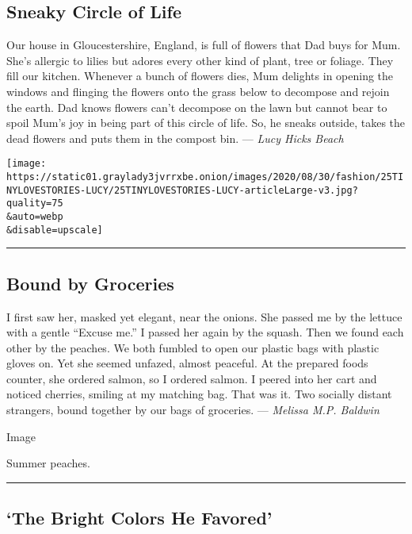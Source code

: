 \hypertarget{sneaky-circle-of-life}{%
\subsection{Sneaky Circle of Life}\label{sneaky-circle-of-life}}

Our house in Gloucestershire, England, is full of flowers that Dad buys
for Mum. She's allergic to lilies but adores every other kind of plant,
tree or foliage. They fill our kitchen. Whenever a bunch of flowers
dies, Mum delights in opening the windows and flinging the flowers onto
the grass below to decompose and rejoin the earth. Dad knows flowers
can't decompose on the lawn but cannot bear to spoil Mum's joy in being
part of this circle of life. So, he sneaks outside, takes the dead
flowers and puts them in the compost bin. --- \emph{Lucy Hicks Beach}

\texttt{[image: https://static01.graylady3jvrrxbe.onion/images/2020/08/30/fashion/25TINYLOVESTORIES-LUCY/25TINYLOVESTORIES-LUCY-articleLarge-v3.jpg?quality=75\\\&auto=webp\\\&disable=upscale]}

\begin{center}\rule{0.5\linewidth}{\linethickness}\end{center}

\hypertarget{bound-by-groceries}{%
\subsection{Bound by Groceries}\label{bound-by-groceries}}

I first saw her, masked yet elegant, near the onions. She passed me by
the lettuce with a gentle ``Excuse me.'' I passed her again by the
squash. Then we found each other by the peaches. We both fumbled to open
our plastic bags with plastic gloves on. Yet she seemed unfazed, almost
peaceful. At the prepared foods counter, she ordered salmon, so I
ordered salmon. I peered into her cart and noticed cherries, smiling at
my matching bag. That was it. Two socially distant strangers, bound
together by our bags of groceries. --- \emph{Melissa M.P. Baldwin}

Image

Summer peaches.

\begin{center}\rule{0.5\linewidth}{\linethickness}\end{center}

\hypertarget{the-bright-colors-he-favored}{%
\subsection{`The Bright Colors He
Favored'}\label{the-bright-colors-he-favored}}

